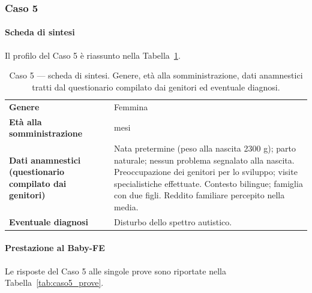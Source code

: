  \subsubsection*{Caso 5}

 \paragraph*{Scheda di sintesi}

Il profilo del Caso 5 è riassunto nella Tabella~\ref{tab:caso5_scheda}.

\begin{table}[htbp]
\centering
\caption[Caso 5 --- scheda di sintesi]{Caso 5 --- scheda di sintesi. Genere, età alla somministrazione, dati anamnestici tratti dal questionario compilato dai genitori ed eventuale diagnosi.}
\label{tab:caso5_scheda}
\begin{tabular}{|>{\raggedright\arraybackslash}p{4.3cm}|>{\raggedright\arraybackslash}p{9.2cm}|}
\toprule
\textbf{Genere} & Femmina \\
\textbf{Età alla somministrazione} & 38 mesi \\
\textbf{Dati anamnestici (questionario compilato dai genitori)} & Nata pretermine (peso alla nascita 2300 g); parto naturale; nessun problema segnalato alla nascita. Preoccupazione dei genitori per lo sviluppo; visite specialistiche effettuate. Contesto bilingue; famiglia con due figli. Reddito familiare percepito nella media. \\
\textbf{Eventuale diagnosi} & Disturbo dello spettro autistico. \\
\bottomrule
\end{tabular}
\end{table}

 \paragraph*{Prestazione al Baby-FE}

Le risposte del Caso 5 alle singole prove sono riportate nella Tabella~\ref{tab:caso5_prove}.

